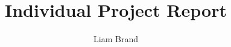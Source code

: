 \documentclass[a4paper,11pt,nocenter,bold,notitlepage,noheadline,noindent]{thesis}
\title{Individual Project Report}
\author{Liam Brand}
\begin{document}
	\maketitle
	\tableofcontents
	\listoffigures
	\listoftables
	
	
	
	
	\nocite{stachniss2013robotmappingintro}
	
	
	
\end{document}
